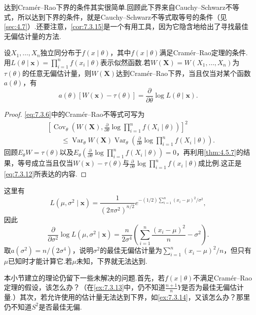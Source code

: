 达到Cramér--Rao下界的条件其实很简单.回顾此下界来自Cauchy--Schwarz不等式，所以达到下界的条件，就是Cauchy--Schwarz不等式取等号的条件（见\autoref{sec:4.7}）.还要注意，\autoref{cor:7.3.15}是一个有用工具，因为它隐含地给出了寻找最佳无偏估计量的方法.
\begin{corollary}[下界的达到]\label{cor:7.3.15}
设$X_1,\ldots,X_n$独立同分布于$f(x\mid\theta)$，其中$f(x\mid\theta)$满足Cramér--Rao定理的条件.用$L(\theta\mid\boldsymbol x)=\prod_{i=1}^nf(x_i\mid\theta)$表示似然函数.若$W(\boldsymbol X)=W(X_1,\ldots,X_n)$为$\tau(\theta)$的任意无偏估计量，则$W(\boldsymbol X)$达到Cramér--Rao下界，当且仅当对某个函数$a(\theta)$，有
\begin{equation}\label{eq:7.3.12}
a(\theta)[W(\boldsymbol x)-\tau(\theta)]=\frac\partial{\partial\theta}\log L(\theta\mid\boldsymbol x).
\end{equation}
\end{corollary}
\begin{proof}
\eqref{eq:7.3.6}中的Cramér--Rao不等式可写为
\begin{align*}
&\left[\operatorname{Cov}_\theta\left(W(\boldsymbol X),\frac\partial{\partial\theta}\log\prod_{i=1}^nf(X_i\mid\theta)\right)\right]^2\\
&\qquad\le\operatorname{Var}_\theta W(\boldsymbol X)\operatorname{Var}_\theta\left(\frac\partial{\partial\theta}\log\prod_{i=1}^nf(X_i\mid\theta)\right).
\end{align*}
回顾$E_\theta W=\tau(\theta)$以及$E_\theta(\frac\partial{\partial\theta}\log\prod_{i=1}^nf(X_i\mid\theta))=0$，再利用\autoref{thm:4.5.7}的结果，等号成立当且仅当$W(\boldsymbol x)-\tau(\theta)$与$\frac\partial{\partial\theta}\log\prod_{i=1}^nf(x_i\mid\theta)$成比例.这正是\eqref{eq:7.3.12}所表达的内容.
\end{proof}
\begin{example}[续\autoref{ex:7.3.14}]\label{ex:7.3.16}
这里有
$$L(\mu,\sigma^2\mid\boldsymbol x)=\frac1{(2\pi\sigma^2)^{n/2}}e^{-(1/2)\sum_{i=1}^n(x_i-\mu)^2/\sigma^2},$$
因此
$$\frac\partial{\partial\sigma^2}\log L(\mu,\sigma^2\mid\boldsymbol x)=\frac n{2\sigma^4}\left(\sum_{i=1}^n\frac{(x_i-\mu)^2}n-\sigma^2\right).$$
取$a(\sigma^2)=n/(2\sigma^4)$，说明$\sigma^2$的最佳无偏估计量为$\sum_{i=1}^n(x_i-\mu)^2/n$，但只有$\mu$已知时才能计算它.若$\mu$未知，下界就无法达到.
\end{example}
本小节建立的理论仍留下一些未解决的问题.首先，若$f(x\mid\theta)$不满足Cramér--Rao定理的假设，该怎么办？（在\autoref{ex:7.3.13}中，仍不知道$\frac{n+1}nY$是否为最佳无偏估计量.）其次，若允许使用的估计量无法达到下界，如\autoref{ex:7.3.14}，又该怎么办？那里仍不知道$S^2$是否最佳无偏.

